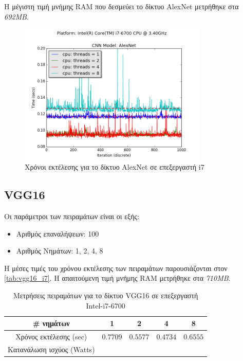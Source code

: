 Η μέγιστη τιμή μνήμης RAM που δεσμεύει το δίκτυο AlexNet μετρήθηκε στα \emph{692MB}.

\begin{figure}[H]
  \centering
  \includegraphics[width=0.8\textwidth]{./images/chapter6/benchmark_alexnet_i7.png}
  \caption[Χρόνoι εκτέλεσης για το δίκτυο AlexNet σε επεξεργαστή i7]{Χρόνοι εκτέλεσης για το δίκτυο AlexNet σε επεξεργαστή i7}
  \label{fig:alexnet_results_i7}
\end{figure}




\subsection{VGG16}

Οι παράμετροι των πειραμάτων είναι οι εξής:
\begin{itemize}
  \item{Αριθμός επαναλήψεων: 100}
  \item{Αριθμός Νημάτων: 1, 2, 4, 8}
\end{itemize}

Η μέσες τιμές του χρόνου εκτέλεσης των πειραμάτων παρουσιάζονται στον \autoref{tab:vgg16_i7}.
Η απαιτούμενη τιμή μνήμης RAM μετρήθηκε στα \emph{710MB}.

\begin{table}[H]
  \begin{center}
    \caption{Μετρήσεις πειραμάτων για το δίκτυο VGG16 σε επεξεργαστή Intel-i7-6700}
    \label{tab:vgg16_i7}
    \begin{tabular}{ | c | c | c | c | c | }
      \hline
      \rowcolor{Gray}
      \# νημάτων & 1 & 2 & 4 & 8 \\
      \hline
      Χρόνος εκτέλεσης (sec) & $0.7709$ & $0.5577$ & $0.4734$ & $0.6555$ \\
      Κατανάλωση ισχύος (Watts) & $ $ & $ $ & $ $ & $ $ \\
      \hline
    \end{tabular}
  \end{center}
\end{table}

